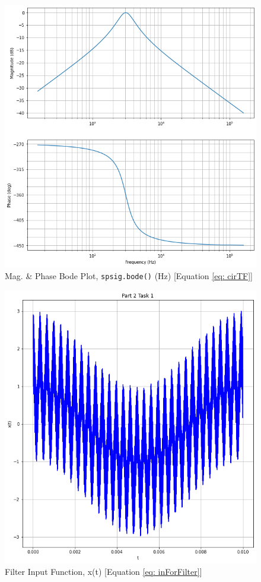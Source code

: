 \documentclass[12pt]{report}
\begin{document}
\begin{figure}[h!]
  \centering
  \includegraphics[width=\linewidth]{p1t3.png}
  \caption{Mag. \& Phase Bode Plot, \texttt{spsig.bode()} (Hz) [Equation \eqref{eq: cirTF}]}
  \label{fig: p1t3}
\end{figure}
\begin{figure}[h!]
  \centering
  \includegraphics[width=\linewidth]{p2t1.png}
  \caption{Filter Input Function, x(t)  [Equation \eqref{eq: inForFilter}]}
  \label{fig: p2t1}
\end{figure}
\end{document}

